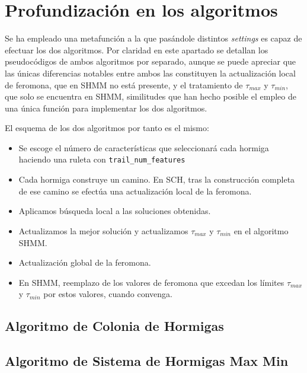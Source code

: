 \documentclass[a4paper,11pt]{article}
\begin{document}
\section{Profundización en los algoritmos}
Se ha empleado una metafunción a la que pasándole distintos \textit{settings} es capaz de efectuar los dos algoritmos.
Por claridad en este apartado se detallan los pseudocódigos de ambos algoritmos por separado, aunque se puede apreciar que
las únicas diferencias notables entre ambos las constituyen la actualización local de feromona, que en SHMM no está presente,
y el tratamiento de $\tau_{max}$ y $\tau_{min}$, que solo se encuentra en SHMM, similitudes que han hecho posible el empleo
de una única función para implementar los dos algoritmos.

El esquema de los dos algoritmos por tanto es el mismo:

\begin{itemize}
 \item Se escoge el número de características que seleccionará cada hormiga haciendo una ruleta con \texttt{trail\_num\_features}
 \item Cada hormiga construye un camino. En SCH, tras la construcción completa de ese camino se efectúa una actualización local
 de la feromona.
 \item Aplicamos búsqueda local a las soluciones obtenidas.
 \item Actualizamos la mejor solución y actualizamos $\tau_{max}$ y $\tau_{min}$ en el algoritmo SHMM.
 \item Actualización global de la feromona.
 \item En SHMM, reemplazo de los valores de feromona que excedan los límites $\tau_{max}$ y $\tau_{min}$ por estos valores, cuando
 convenga.
 
\end{itemize}


  \subsection{Algoritmo de Colonia de Hormigas}

  \small{\texttt{}}
  \normalsize

  \subsection{Algoritmo de Sistema de Hormigas Max Min}

  \small{\texttt{}}
  \normalsize
\end{document}
